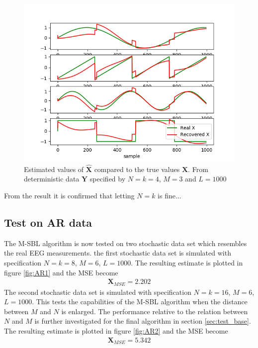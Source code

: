 \begin{figure}[H]
\centering
\includegraphics[scale=0.5]{figures/ch_6/M-SBL_simple3.png}
\caption{Estimated values of $\hat{\textbf{X}}$ compared to the true 				values $\textbf{X}$. From deterministic data $\textbf{Y}$ specified by $N=k=4$, $M = 3$ and $L=1000$ }
\label{fig:M-SBL_simple3}
\end{figure}

From the result it is confirmed that letting $N=k$ is fine... 

\subsection{Test on AR data}
The M-SBL algorithm is now tested on two stochastic data set which resembles the real EEG measurements. 
the first stochastic data set is simulated with specification $N=k=8$, $M = 6$, $L=1000$. The resulting estimate is plotted in figure \ref{fig:AR1} and the MSE become 
\begin{align*}
\textbf{X}_{MSE} = 2.202 
\end{align*}  
The second stochastic data set is simulated with specification $N=k=16$, $M = 6$, $L=1000$. This tests the capabilities of the M-SBL algorithm when the distance between $M$ and $N$ is enlarged. The performance relative to the relation between $N$ and $M$ is further investigated for the final algorithm in section \ref{sec:test_base}.
The resulting estimate is plotted in figure \ref{fig:AR2} and the MSE become 
\begin{align*}
\textbf{X}_{MSE} = 5.342 
\end{align*}  

